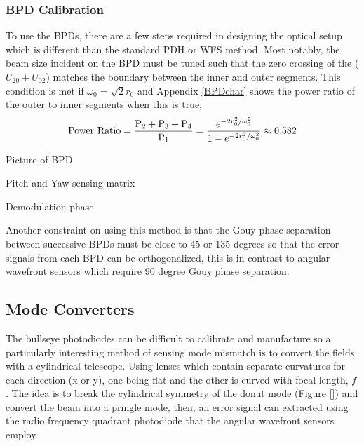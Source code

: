 		\subsubsection{BPD Calibration}
		To use the BPDs, there are a few steps required in designing the optical setup which is different than the standard PDH or WFS method.  Most notably, the beam size incident on the BPD must be tuned such that the zero crossing of the ($U_{20} + U_{02}$) matches the boundary between the inner and outer segments.  This condition is met if $\omega_{0} = \sqrt{2} r_0$ and Appendix \ref{BPDchar} shows the power ratio of the outer to inner segments when this is true,
		\begin{equation}
		\text{Power Ratio} = \frac{\text{P}_2 + \text{P}_3 + \text{P}_4}{\text{P}_1}  \\
		= \frac{e^{-2r_0^2/ \omega_{0}^2}} {1 - e^{-2r_0^2/ \omega_{0}^2 }} \approx 0.582
		\end{equation}
		
		Picture of BPD
		
		Pitch and Yaw sensing matrix
		
		Demodulation phase

		
		Another constraint on using this method is that the Gouy phase separation between successive BPDs must be close to 45 or 135 degrees so that the error signals from each BPD can be orthogonalized, this is in contrast to angular wavefront sensors which require 90 degree Gouy phase separation.

		
\subsection{Mode Converters}
The bullseye photodiodes can be difficult to calibrate and manufacture so a particularly interesting method of sensing mode mismatch is to convert the fields with a cylindrical telescope.  Using lenses which contain separate curvatures for each direction (x or y), one being flat and the other is curved with focal length, $f$.  The idea is to break the cylindrical symmetry of the donut mode (Figure []) and convert the beam into a pringle mode, then, an error signal can extracted using the radio frequency quadrant photodiode that the angular wavefront sensors employ


